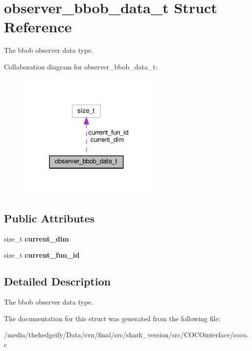 \hypertarget{structobserver__bbob__data__t}{}\section{observer\+\_\+bbob\+\_\+data\+\_\+t Struct Reference}
\label{structobserver__bbob__data__t}


The bbob observer data type.  




Collaboration diagram for observer\+\_\+bbob\+\_\+data\+\_\+t\+:\nopagebreak
\begin{figure}[H]
\begin{center}
\leavevmode
\includegraphics[width=202pt]{structobserver__bbob__data__t__coll__graph}
\end{center}
\end{figure}
\subsection*{Public Attributes}
\begin{DoxyCompactItemize}
\item 
size\+\_\+t {\bfseries current\+\_\+dim}\hypertarget{structobserver__bbob__data__t_af8520c47196d0e47e339c786eecf8dae}{}\label{structobserver__bbob__data__t_af8520c47196d0e47e339c786eecf8dae}

\item 
size\+\_\+t {\bfseries current\+\_\+fun\+\_\+id}\hypertarget{structobserver__bbob__data__t_ab3a26a4e45eb9ea7c989109a01d6cc89}{}\label{structobserver__bbob__data__t_ab3a26a4e45eb9ea7c989109a01d6cc89}

\end{DoxyCompactItemize}


\subsection{Detailed Description}
The bbob observer data type. 

The documentation for this struct was generated from the following file\+:\begin{DoxyCompactItemize}
\item 
/media/thehedgeify/\+Data/svn/final/src/shark\+\_\+version/src/\+C\+O\+C\+Ointerface/coco.\+c\end{DoxyCompactItemize}
